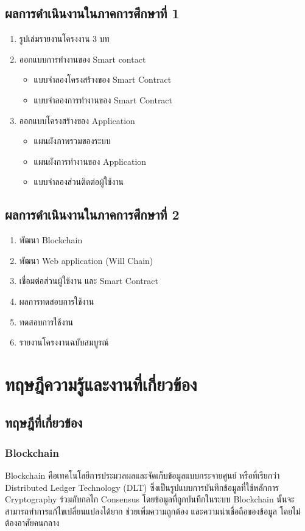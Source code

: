 \documentclass[12pt,oneside,openright,a4paper]{cpe-thai-project}
\begin{document}
\section{ผลการดำเนินงานในภาคการศึกษาที่ 1}
\begin{enumerate}
\item รูปเล่มรายงานโครงงาน 3 บท
\item ออกแบบการทำงานของ Smart contact
	\begin{itemize}
		\item แบบจำลองโครงสร้างของ Smart Contract
		\item แบบจำลองการทำงานของ Smart Contract
	\end{itemize}
\item ออกแบบโครงสร้างของ Application
	\begin{itemize}
		\item แผนผังภาพรวมของระบบ
		\item แผนผังการทำงานของ Application
		\item แบบจำลองส่วนติดต่อผู้ใช้งาน
	\end{itemize}
\end{enumerate}
\section{ผลการดำเนินงานในภาคการศึกษาที่ 2}
\begin{enumerate}
\item พัฒนา Blockchain
\item พัฒนา Web application (Will Chain)
\item เชื่อมต่อส่วนผู้ใช้งาน และ Smart Contract
\item ผลการทดสอบการใช้งาน
\item ทดสอบการใช้งาน
\item รายงานโครงงานฉบับสมบูรณ์
\end{enumerate}

\chapter{ทฤษฎีความรู้และงานที่เกี่ยวข้อง}

\section{ทฤษฎีที่เกี่ยวข้อง}
\subsection{Blockchain \cite{blockchain}} 
\tab Blockchain คือเทคโนโลยีการประมวลผลและจัดเก็บข้อมูลแบบกระจายศูนย์ หรือที่เรียกว่า Distributed Ledger Technology (DLT) ซึ่งเป็นรูปแบบการบันทึกข้อมูลที่ใช้หลักการ Cryptography ร่วมกับกลไก Consensus โดยข้อมูลที่ถูกบันทึกในระบบ Blockchain นั้นจะสามารถทำการแก้ไขเปลี่ยนแปลงได้ยาก ช่วยเพิ่มความถูกต้อง และความน่าเชื่อถือของข้อมูล โดยไม่ต้องอาศัยคนกลาง
\end{document}
